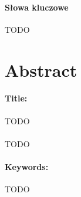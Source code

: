 \documentclass[12pt,a4paper,twoside]{report}
\begin{document}
\paragraph{Słowa kluczowe} TODO

\section*{Abstract}
\paragraph{Title:} TODO\\\\
TODO
\paragraph{Keywords:} TODO

\newpage
\tableofcontents
\newpage











%
% 
%
%
\end{document}
